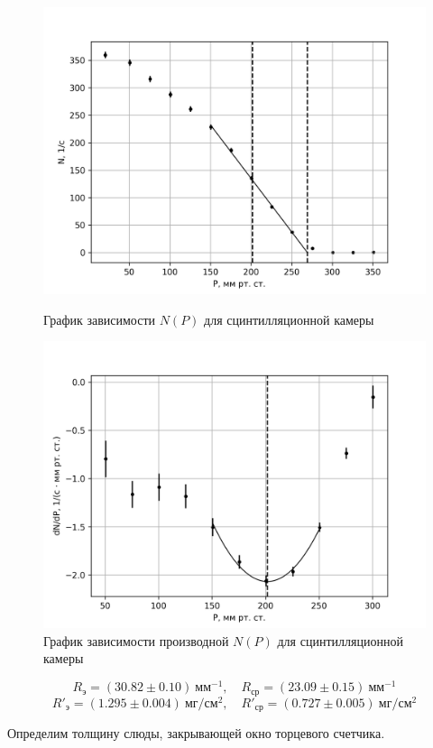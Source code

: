 \documentclass[14pt, a4paper]{report}
\begin{document}
\begin{figure}[H]
\centering
\begin{minipage}{.8\textwidth}
  \centering
  \includegraphics[width=.8\linewidth]{../images/541-5}
  \caption{График зависимости $N(P)$ для сцинтилляционной камеры}
\end{minipage}
\begin{minipage}{.8\textwidth}
  \centering
  \includegraphics[width=.8\linewidth]{../images/541-6}
  \caption{График зависимости производной $N(P)$ для сцинтилляционной камеры}
\end{minipage}
\end{figure}

\[R_{э}=(30.82\pm0.10)\ мм^{-1},\quad R_{ср}=(23.09\pm0.15)\ мм^{-1}\]
\[R'_{э}=(1.295\pm0.004)\ мг/см^2,\quad R'_{ср}=(0.727\pm0.005)\ мг/см^2\]

\newpage

Определим толщину слюды, закрывающей окно торцевого счетчика.
\end{document}
